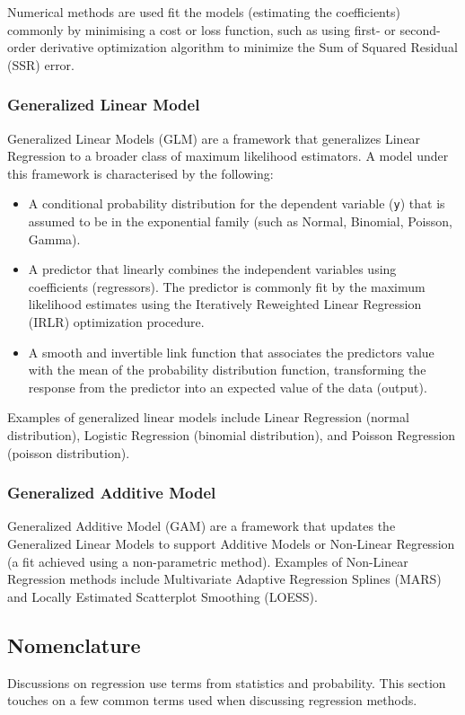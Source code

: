 \begin{bibunit}
Numerical methods are used fit the models (estimating the coefficients) commonly by minimising a cost or loss function, such as using first- or second-order derivative optimization algorithm to minimize the Sum of Squared Residual (SSR) error.

\subsubsection{Generalized Linear Model}
Generalized Linear Models (GLM) are a framework that generalizes Linear Regression to a broader class of maximum likelihood estimators. A model under this framework is characterised by the following:

\begin{itemize}
	\item A conditional probability distribution for the dependent variable (\texttt{y}) that is assumed to be in the exponential family (such as Normal, Binomial, Poisson, Gamma).
	\item A predictor that linearly combines the independent variables using coefficients (regressors). The predictor is commonly fit by the maximum likelihood estimates using the Iteratively Reweighted Linear Regression (IRLR) optimization procedure.
	\item A smooth and invertible link function that associates the predictors value with the mean of the probability distribution function, transforming the response from the predictor into an expected value of the data (output).
\end{itemize}

Examples of generalized linear models include Linear Regression (normal distribution), Logistic Regression (binomial distribution), and Poisson Regression (poisson distribution). 

\subsubsection{Generalized Additive Model}
Generalized Additive Model (GAM) are a framework that updates the Generalized Linear Models to support Additive Models or Non-Linear Regression (a fit achieved using a non-parametric method).
Examples of Non-Linear Regression methods include Multivariate Adaptive Regression Splines (MARS) and Locally Estimated Scatterplot Smoothing (LOESS).


\subsection{Nomenclature}
Discussions on regression use terms from statistics and probability. This section touches on a few common terms used when discussing regression methods.


\end{bibunit}

